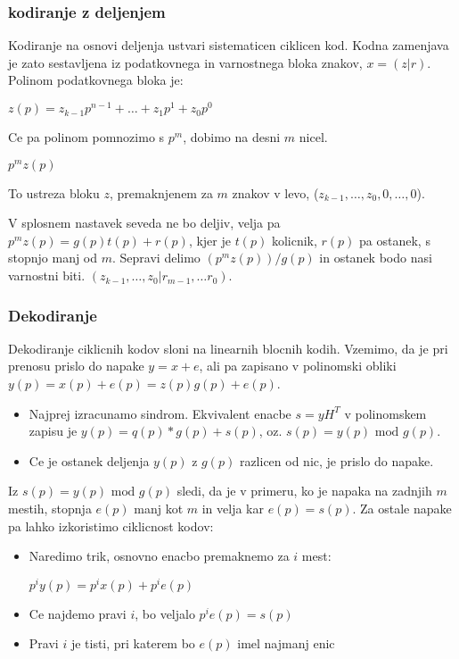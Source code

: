 \documentclass{article}
\begin{document}
\begin{multicols}{4}
\subsubsection{kodiranje z deljenjem}
Kodiranje na osnovi deljenja ustvari sistematicen ciklicen kod. Kodna zamenjava je zato sestavljena iz podatkovnega in varnostnega bloka znakov, $x = (z | r)$.
Polinom podatkovnega bloka je:
\begin{center}
    \begin{math}
        z(p) = z_{k-1}p^{n-1} + \dots + z_1p^{1} + z_0p^0
    \end{math}
\end{center}
Ce pa polinom pomnozimo s $p^m$, dobimo na desni $m$ nicel.
\begin{center}
    \begin{math}
        p^m z(p)
    \end{math}
\end{center}
To ustreza bloku $z$, premaknjenem za $m$ znakov v levo, ($z_{k-1}, \dots, z_0, 0, \dots, 0$).

V splosnem nastavek seveda ne bo deljiv, velja pa $p^mz(p) = g(p)t(p) + r(p)$, kjer je $t(p)$ kolicnik,
$r(p)$ pa ostanek, s stopnjo manj od $m$. Sepravi delimo $(p^m z(p)) / g(p)$ in ostanek bodo nasi varnostni biti.
$(z_{k-1}, \dots, z_0 | r_{m-1}, \dots r_0)$.

\subsubsection{Dekodiranje}
Dekodiranje ciklicnih kodov sloni na linearnih blocnih kodih. Vzemimo, da je pri prenosu prislo do napake $y = x + e$, ali pa zapisano v polinomski
obliki $y(p) = x(p) + e(p) = z(p)g(p) + e(p)$.
\begin{itemize}
    \item Najprej izracunamo sindrom. Ekvivalent enacbe $s = yH^T$ v polinomskem zapisu je $y(p) = q(p)*g(p) + s(p)$, oz. $s(p) = y(p) \text{ mod } g(p)$.
    \item Ce je ostanek deljenja $y(p)$ z $g(p)$ razlicen od nic, je prislo do napake.
\end{itemize}
Iz $s(p) = y(p) \text{ mod } g(p)$ sledi, da je v primeru, ko je napaka na zadnjih $m$ mestih, stopnja $e(p)$ manj kot $m$ in velja kar $e(p) = s(p)$.
Za ostale napake pa lahko izkoristimo ciklicnost kodov:
\begin{itemize}
    \item Naredimo trik, osnovno enacbo premaknemo za $i$ mest:
        \begin{center}
            $p^iy(p) = p^ix(p) + p^i e(p)$
        \end{center}
    \item Ce najdemo pravi $i$, bo veljalo $p^i e(p) = s(p)$
    \item Pravi $i$ je tisti, pri katerem bo $e(p)$ imel najmanj enic
\end{itemize}


\end{multicols}
\end{document}
